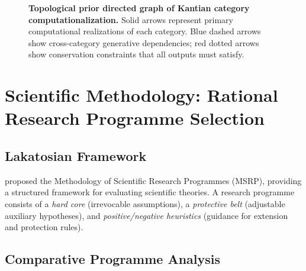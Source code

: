 \documentclass[11pt,a4paper]{article}
\newcommand{\msrp}{\textsc{MSRP}}
\begin{document}
\begin{figure}[H]
{%
}
\caption{\textbf{Topological prior directed graph of Kantian category computationalization.} Solid arrows represent primary computational realizations of each category. Blue dashed arrows show cross-category generative dependencies; red dotted arrows show conservation constraints that all outputs must satisfy.}\label{fig:topological-prior}
\end{figure}

\section{Scientific Methodology: Rational Research Programme Selection}\label{sec:methodology}

\subsection{Lakatosian Framework}

\citet{lakatos1970falsification} proposed the Methodology of Scientific Research Programmes (\msrp{}), providing a structured framework for evaluating scientific theories. A research programme consists of a \emph{hard core} (irrevocable assumptions), a \emph{protective belt} (adjustable auxiliary hypotheses), and \emph{positive/negative heuristics} (guidance for extension and protection rules).

\subsection{Comparative Programme Analysis}
\end{document}
